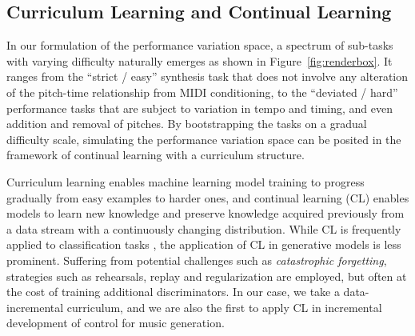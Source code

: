 \subsection{Curriculum Learning and Continual Learning}

In our formulation of the performance variation space, a spectrum of sub-tasks with varying difficulty naturally emerges as shown in Figure~\ref{fig:renderbox}. It ranges from the ``strict / easy'' synthesis task that does not involve any alteration of the pitch-time relationship from MIDI conditioning, to the ``deviated / hard'' performance tasks that are subject to variation in tempo and timing, and even addition and removal of pitches.  By bootstrapping the tasks on a gradual difficulty scale, simulating the performance variation space can be posited in the framework of continual learning with a curriculum structure. 

Curriculum learning \cite{Wang2021SurveyLearning} enables machine learning model training to progress gradually from easy examples to harder ones, and continual learning (CL) 
enables models to learn new knowledge and preserve knowledge acquired previously from a data stream with a continuously changing distribution.  
While CL is frequently applied to classification tasks \cite{Wang2019ContinualReplay,Bhatt2024CharacterizingAnalysis,Faber2023MNISTLearning}, the application of CL in generative models 
is less prominent. Suffering from potential challenges such as \textit{catastrophic forgetting}, strategies such as rehearsals, replay and regularization are employed, but often at the cost of training additional discriminators. In our case, we take a data-incremental curriculum, and we are also the first to apply CL in incremental development of control for music generation.